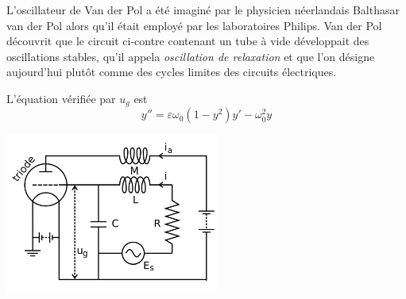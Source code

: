 \begin{minipage}{.45\linewidth}
L’oscillateur de Van der Pol a été imaginé par le physicien néerlandais Balthasar van der Pol alors qu'il était employé par les laboratoires {\sc Philips}. Van der Pol découvrit que le circuit ci-contre contenant un tube à vide développait des oscillations stables, qu'il appela \emph{oscillation de relaxation} et que l'on désigne aujourd'hui plutôt comme des cycles limites des circuits électriques.

L'équation vérifiée par  $u_g$ est
\[y'' = \varepsilon\omega_0(1-y^2)y'-\omega_0^2y\]
\end{minipage}
\begin{minipage}[c]{.55\linewidth}
  \begin{center}
    \includegraphics[width=7cm]{TP/Images/ED2_van_der_pol.png}
   \end{center}
\end{minipage}
\medskip

